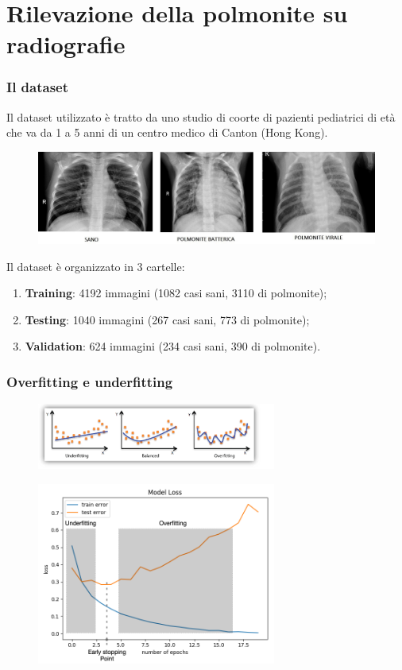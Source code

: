 \documentclass{beamer}
\begin{document}
\section{Rilevazione della polmonite su radiografie}
\begin{frame}
	\frametitle{Il dataset}
	Il dataset utilizzato è tratto
	 da uno studio di coorte di pazienti pediatrici di età che va da 1 a 5 anni di un centro medico di Canton (Hong Kong).
	 \smallskip
	\begin{figure}
		\includegraphics[width=1\textwidth]{sano.jpeg}
	\end{figure}
	Il dataset è organizzato in  3 cartelle: 
	\begin{enumerate}
		\item \textbf{Training}: 4192 immagini (1082 casi sani, 3110 di polmonite);
		\item \textbf{Testing}: 1040 immagini (267 casi sani, 773 di polmonite);
		\item \textbf{Validation}: 624 immagini (234 casi sani, 390 di polmonite).
	\end{enumerate}
	
\end{frame}

\begin{frame}
	\frametitle{Overfitting e underfitting}
	
	\begin{figure}
		\includegraphics[width=0.7\textwidth]{ofuf.png}
	\end{figure}

		
	\begin{figure}
		\includegraphics[width=0.7\textwidth]{ofufkeras.png}
	\end{figure}

\end{frame}
\end{document}
